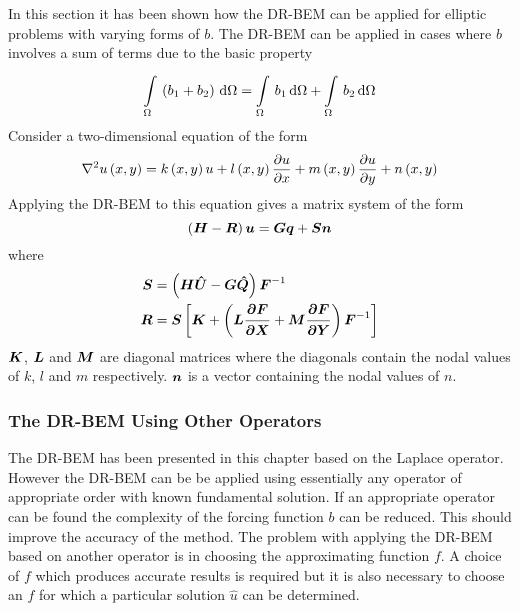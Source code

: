 In this section it has been shown how the DR-BEM can be applied for
elliptic problems with varying forms of $b$.  The DR-BEM can be applied in
cases where $b$ involves a sum of terms due to the basic property
\begin{equation}
  \goneint{\pbrac{b_{1} + b_{2}}}{\Omega} = \goneint{b_{1}}{\Omega} +
  \goneint{b_{2}}{\Omega}
\end{equation}
Consider a two-dimensional equation of the form
\begin{equation}
  \laplacian{}{\fnof{u}{x,y}} = \fnof{k}{x,y} u + \fnof{l}{x,y} \delby{u}{x} +
  \fnof{m}{x,y} \delby{u}{y} + \fnof{n}{x,y}
\end{equation}
Applying the DR-BEM to this equation gives a matrix system of the form
\begin{equation}
  \pbrac{\matr{H} - \matr{R}} \vect{u} = \matr{G} \vect{q} + \matr{S} \vect{n}
\end{equation}
where
\begin{align}
  \matr{S} & = \pbrac{\matr{H} \matr{\hat{U}} - \matr{G} \matr{\hat{Q}}}
  \matr{F}^{-1} \label{eq:srelate} \\ \matr{R} & = \matr{S} \sqbrac{\matr{K} +
    \pbrac{\matr{L} \matr{\delby{F}{x}} + \matr{M} \matr{\delby{F}{y}}}
  \matr{F}^{-1}}
\label{eq:rrelate} 
\end{align}
$\matr{K}$, $\matr{L}$ and $\matr{M}$ are diagonal matrices where the
diagonals contain the nodal values of $k$, $l$ and $m$ respectively.
$\vect{n}$ is a vector containing the nodal values of $n$.  

\subsubsection{The DR-BEM Using Other Operators}
\label{sec:otheroperators}

The DR-BEM has been presented in this chapter based on the Laplace
operator.  However the DR-BEM can be be applied using essentially any
operator of appropriate order with known fundamental solution.  If an
appropriate operator can be found the complexity of the forcing function
$b$ can be reduced.  This should improve the accuracy of the method.  The
problem with applying the DR-BEM based on another operator is in
choosing the approximating function $f$.  A choice of $f$ which produces
accurate results is required but it is also necessary to choose an $f$ for
which a particular solution $\hat{u}$ can be determined. 

